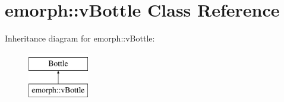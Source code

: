 \hypertarget{classemorph_1_1vBottle}{\section{emorph\-:\-:v\-Bottle Class Reference}
\label{classemorph_1_1vBottle}
}
Inheritance diagram for emorph\-:\-:v\-Bottle\-:\begin{figure}[H]
\begin{center}
\leavevmode
\includegraphics[height=2.000000cm]{classemorph_1_1vBottle}
\end{center}
\end{figure}
